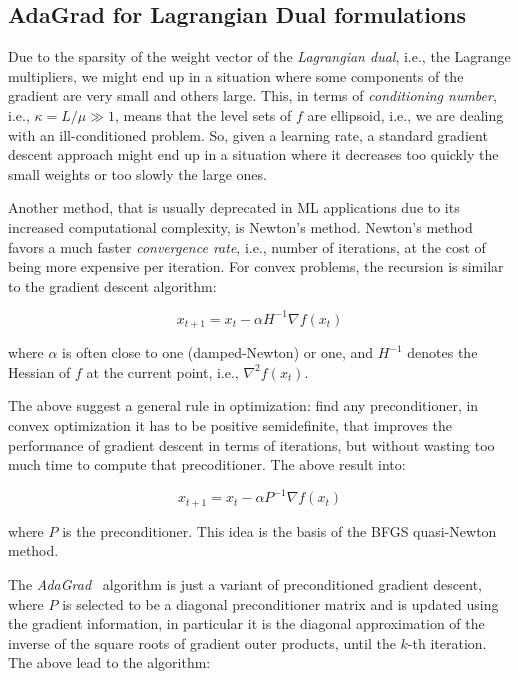 \pagebreak

\subsection{AdaGrad for Lagrangian Dual formulations}

Due to the sparsity of the weight vector of the \emph{Lagrangian dual}, i.e., the Lagrange multipliers, we might end up in a situation where some components of the gradient are very small and others large. This, in terms of \emph{conditioning number}, i.e., $\kappa = L/\mu \gg 1$, means that the level sets of $f$ are ellipsoid, i.e., we are dealing with an ill-conditioned problem. So, given a learning rate, a standard gradient descent approach might end up in a situation where it decreases too quickly the small weights or too slowly the large ones.

Another method, that is usually deprecated in ML applications due to its increased computational complexity, is Newton’s method. Newton’s method favors a much faster \emph{convergence rate}, i.e., number of iterations, at the cost of being more expensive per iteration. For convex problems, the recursion is similar to the gradient descent algorithm:

$$
x_{t+1} = x_t - \alpha H^{-1} \nabla f(x_t)
$$

where $\alpha$ is often close to one (damped-Newton) or one, and $H^{-1}$ denotes the Hessian of $f$ at the current point, i.e., $\nabla^2 f(x_t)$.

The above suggest a general rule in optimization: find any preconditioner, in convex optimization it has to be positive semidefinite, that improves the performance of gradient descent in terms of iterations, but without wasting too much time to compute that precoditioner. The above result into:

$$
x_{t+1} = x_t - \alpha P^{-1} \nabla f(x_t)
$$

where $P$ is the preconditioner. This idea is the basis of the BFGS quasi-Newton method.

The \emph{AdaGrad}~\cite{duchi2011adaptive} algorithm is just a variant of preconditioned gradient descent, where $P$ is selected to be a diagonal preconditioner matrix and is updated using the gradient information, in particular it is the diagonal approximation of the inverse of the square roots of gradient outer products, until the $k$-th iteration. The above lead to the algorithm:

